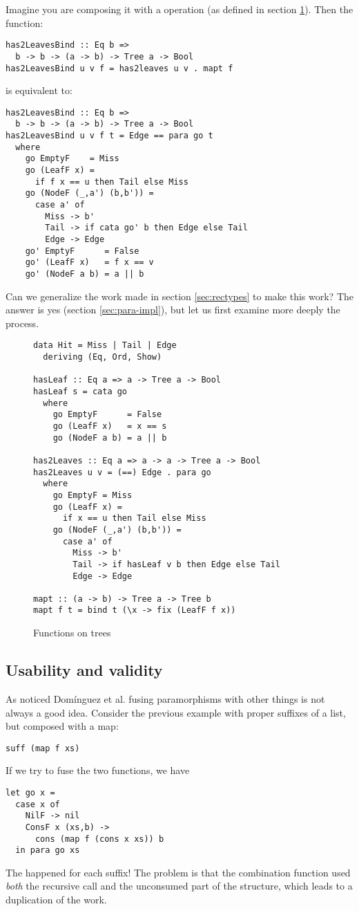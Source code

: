 Imagine you are composing it with a  operation (as defined in section \ref{fig:has2Leaves}). Then
the function:
\begin{verbatim}
has2LeavesBind :: Eq b =>
  b -> b -> (a -> b) -> Tree a -> Bool
has2LeavesBind u v f = has2leaves u v . mapt f
\end{verbatim}
\noindent is equivalent to:
\begin{verbatim}
has2LeavesBind :: Eq b =>
  b -> b -> (a -> b) -> Tree a -> Bool
has2LeavesBind u v f t = Edge == para go t
  where
    go EmptyF    = Miss
    go (LeafF x) =
      if f x == u then Tail else Miss
    go (NodeF (_,a') (b,b')) =
      case a' of
        Miss -> b'
        Tail -> if cata go' b then Edge else Tail
        Edge -> Edge
    go' EmptyF      = False
    go' (LeafF x)   = f x == v
    go' (NodeF a b) = a || b
\end{verbatim}

Can we generalize the work made in section \ref{sec:rectypes} to make this work? The answer is yes (section \ref{sec:para-impl}), but let us first examine more deeply the process.

\begin{figure}
\begin{verbatim}
data Hit = Miss | Tail | Edge
  deriving (Eq, Ord, Show)

hasLeaf :: Eq a => a -> Tree a -> Bool
hasLeaf s = cata go
  where
    go EmptyF      = False
    go (LeafF x)   = x == s
    go (NodeF a b) = a || b

has2Leaves :: Eq a => a -> a -> Tree a -> Bool
has2Leaves u v = (==) Edge . para go
  where
    go EmptyF = Miss
    go (LeafF x) =
      if x == u then Tail else Miss
    go (NodeF (_,a') (b,b')) =
      case a' of
        Miss -> b'
        Tail -> if hasLeaf v b then Edge else Tail
        Edge -> Edge

mapt :: (a -> b) -> Tree a -> Tree b
mapt f t = bind t (\x -> fix (LeafF f x))
\end{verbatim}
\caption{Functions on trees}
\label{fig:has2Leaves}
\end{figure}

\subsection{Usability and validity}
As noticed Domínguez et al. \cite{paramorphismFusion} fusing paramorphisms with other things is not always a good idea. Consider the previous example with proper suffixes of a list, but composed with a map:
\begin{verbatim}
suff (map f xs)
\end{verbatim}
\noindent If we try to fuse the two functions, we have
\begin{verbatim}
let go x =
  case x of
    NilF -> nil
    ConsF x (xs,b) -> 
      cons (map f (cons x xs)) b
  in para go xs
\end{verbatim}
\noindent The  happened for each suffix! The problem is that the combination function used \emph{both} the recursive call and the unconsumed part of the structure, which leads to a duplication of the work.

